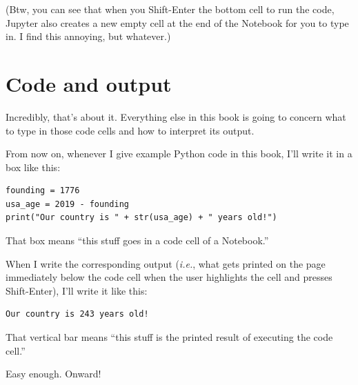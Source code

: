 (Btw, you can see that when you Shift-Enter the bottom cell to run the code,
Jupyter also creates a new empty cell at the end of the Notebook for you to
type in. I find this annoying, but whatever.)

\section{Code and output}

Incredibly, that's about it. Everything else in this book is going to concern
what to type in those code cells and how to interpret its output.

From now on, whenever I give example Python code in this book, I'll write it in
a box like this:

\begin{Verbatim}[fontsize=\small,samepage=true,frame=single,framesep=3mm]
founding = 1776
usa_age = 2019 - founding
print("Our country is " + str(usa_age) + " years old!")
\end{Verbatim}

That box means ``this stuff goes in a code cell of a Notebook.''

When I write the corresponding output (\textit{i.e.}, what gets printed on the
page immediately below the code cell when the user highlights the cell and
presses Shift-Enter), I'll write it like this:

\begin{Verbatim}[fontsize=\small,samepage=true,frame=leftline,framesep=5mm,framerule=1mm]
Our country is 243 years old!
\end{Verbatim}

That vertical bar means ``this stuff is the printed result of executing the
code cell.''

Easy enough. Onward!
